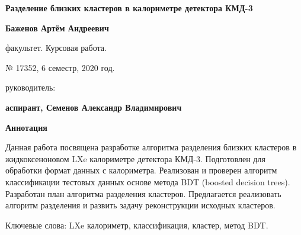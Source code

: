 \documentclass[14pt]{extarticle}
\begin{document}
	\setlength{\abovedisplayskip}{6pt}
	\setlength{\belowdisplayskip}{6pt}
	\setlength{\belowcaptionskip}{-15pt}
	\thispagestyle{fancy}
\begin{center}
    \textbf{Разделение близких кластеров в калориметре детектора КМД-3}
\end{center}

\noindent\textbf{Баженов Артём Андреевич}

 факультет. Курсовая работа.

 № 17352, 6 семестр, 2020 год.

 руководитель:

\noindent\textbf{аспирант, Семенов Александр Владимирович}

\noindent\textbf{Аннотация}

Данная работа посвящена разработке алгоритма разделения близких кластеров в жидкоксеноновом LXe калориметре детектора КМД-3. Подготовлен для обработки формат данных с калориметра. Реализован и проверен алгоритм классификации тестовых данных основе метода BDT (boosted decision trees). Разработан план алгоритма разделения кластеров. Предлагается реализовать алгоритм разделения и развить задачу реконструкции исходных кластеров.

Ключевые слова: LXe калориметр, классификация, кластер, метод BDT.
\end{document}
